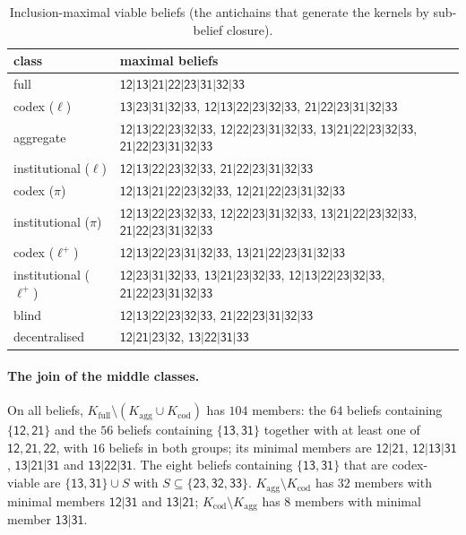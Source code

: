 \documentclass[11pt,a4paper]{article}
\theoremstyle{plain}
\theoremstyle{definition}
\theoremstyle{remark}
\newcommand{\st}[1]{\mathsf{#1}}
\newcommand{\led}{\ell}
\newcommand{\priv}{\pi}
\newcommand{\opt}{\ell^{+}}
\newcommand{\Kagg}{K_{\mathrm{agg}}}
\newcommand{\Kcod}{K_{\mathrm{cod}}}
\newcommand{\Kfull}{K_{\mathrm{full}}}
\begin{document}
\begin{table}[H]
\centering\footnotesize
\caption{Inclusion-maximal viable beliefs (the antichains that generate the kernels by sub-belief closure).}
\label{tab:maximal}
\begin{tabular}{lp{}}
\toprule
class & maximal beliefs \\
\midrule
full & $\st{12|13|21|22|23|31|32|33}$ \\
codex ($\led$) & $\st{13|23|31|32|33}$, $\st{12|13|22|23|32|33}$, $\st{21|22|23|31|32|33}$ \\
aggregate & $\st{12|13|22|23|32|33}$, $\st{12|22|23|31|32|33}$, $\st{13|21|22|23|32|33}$, $\st{21|22|23|31|32|33}$ \\
institutional ($\led$) & $\st{12|13|22|23|32|33}$, $\st{21|22|23|31|32|33}$ \\
codex ($\priv$) & $\st{12|13|21|22|23|32|33}$, $\st{12|21|22|23|31|32|33}$ \\
institutional ($\priv$) & $\st{12|13|22|23|32|33}$, $\st{12|22|23|31|32|33}$, $\st{13|21|22|23|32|33}$, $\st{21|22|23|31|32|33}$ \\
codex ($\opt$) & $\st{12|13|22|23|31|32|33}$, $\st{13|21|22|23|31|32|33}$ \\
institutional ($\opt$) & $\st{12|23|31|32|33}$, $\st{13|21|23|32|33}$, $\st{12|13|22|23|32|33}$, $\st{21|22|23|31|32|33}$ \\
blind & $\st{12|13|22|23|32|33}$, $\st{21|22|23|31|32|33}$ \\
decentralised & $\st{12|21|23|32}$, $\st{13|22|31|33}$ \\
\bottomrule
\end{tabular}
\end{table}

\paragraph{The join of the middle classes.}
On all beliefs, $\Kfull\setminus(\Kagg\cup\Kcod)$ has $104$ members: the $64$ beliefs containing $\{\st{12},\st{21}\}$ and the $56$ beliefs containing $\{\st{13},\st{31}\}$ together with at least one of $\st{12},\st{21},\st{22}$, with $16$ beliefs in both groups; its minimal members are $\st{12|21}$, $\st{12|13|31}$, $\st{13|21|31}$ and $\st{13|22|31}$. The eight beliefs containing $\{\st{13},\st{31}\}$ that are codex-viable are $\{\st{13},\st{31}\}\cup S$ with $S\subseteq\{\st{23},\st{32},\st{33}\}$. $\Kagg\setminus\Kcod$ has $32$ members with minimal members $\st{12|31}$ and $\st{13|21}$; $\Kcod\setminus\Kagg$ has $8$ members with minimal member $\st{13|31}$.
\end{document}
